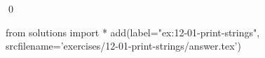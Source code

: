 
\begin{ex}
  \label{ex:12-01-print-strings}
  
  \qed
\end{ex}
\begin{python0}
from solutions import *
add(label="ex:12-01-print-strings",
    srcfilename='exercises/12-01-print-strings/answer.tex')
\end{python0}
